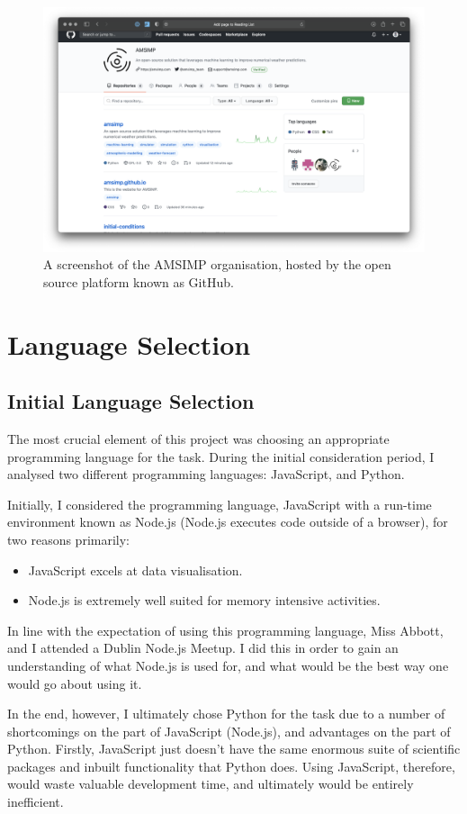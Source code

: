 \begin{figure}[H]
    \centering
    \includegraphics[width=.8\linewidth]{Images/github}
    \caption{A screenshot of the AMSIMP organisation, hosted by the open source platform known as GitHub.}
    \label{github}
\end{figure}

\section{Language Selection}
\subsection{Initial Language Selection}
The most crucial element of this project was choosing an appropriate programming language for the task. During the initial consideration period, I analysed two different programming languages: JavaScript, and Python\cite{python}. 

Initially, I considered the programming language, JavaScript with a run-time environment known as Node.js (Node.js executes code outside of a browser), for two reasons primarily:

\begin{itemize}
    \item JavaScript excels at data visualisation.
    \item Node.js is extremely well suited for memory intensive activities.
\end{itemize}

In line with the expectation of using this programming language, Miss Abbott, and I attended a Dublin Node.js Meetup. I did this in order to gain an understanding of what Node.js is used for, and what would be the best way one would go about using it. 

In the end, however, I ultimately chose Python for the task due to a number of shortcomings on the part of JavaScript (Node.js), and advantages on the part of Python. Firstly, JavaScript just doesn’t have the same enormous suite of scientific packages and inbuilt functionality that Python does. Using JavaScript, therefore, would waste valuable development time, and ultimately would be entirely inefficient.

